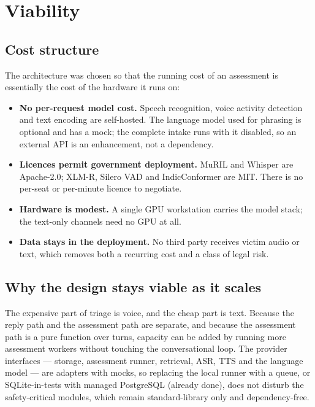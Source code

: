 \documentclass[11pt,a4paper]{article}
\begin{document}
\section{Viability}
\label{sec:viability}

\subsection{Cost structure}
The architecture was chosen so that the running cost of an assessment is essentially the cost of the
hardware it runs on:

\begin{itemize}
  \item \textbf{No per-request model cost.} Speech recognition, voice activity detection and text
        encoding are self-hosted. The language model used for phrasing is optional and has a mock;
        the complete intake runs with it disabled, so an external API is an enhancement, not a
        dependency.
  \item \textbf{Licences permit government deployment.} MuRIL and Whisper are Apache-2.0; XLM-R,
        Silero VAD and IndicConformer are MIT. There is no per-seat or per-minute licence to
        negotiate.
  \item \textbf{Hardware is modest.} A single GPU workstation carries the model stack; the text-only
        channels need no GPU at all.
  \item \textbf{Data stays in the deployment.} No third party receives victim audio or text, which
        removes both a recurring cost and a class of legal risk.
\end{itemize}

\subsection{Why the design stays viable as it scales}
The expensive part of triage is voice, and the cheap part is text. Because the reply path and the
assessment path are separate, and because the assessment path is a pure function over turns, capacity
can be added by running more assessment workers without touching the conversational loop. The
provider interfaces --- storage, assessment runner, retrieval, ASR, TTS and the language model --- are
adapters with mocks, so replacing the local runner with a queue, or SQLite-in-tests with managed
PostgreSQL (already done), does not disturb the safety-critical modules, which remain standard-library
only and dependency-free.
\end{document}

